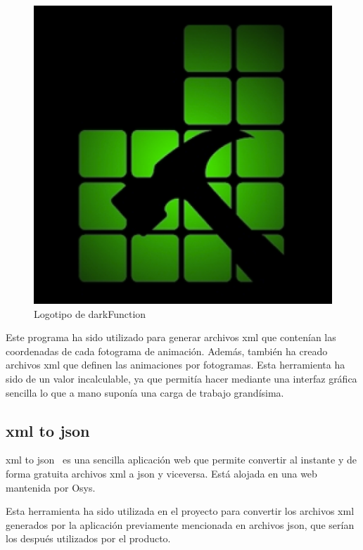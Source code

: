 		\begin{figure}[!htp]
			 \centering
			 \includegraphics[scale=.25]{fig/darkF}
			 \caption{Logotipo de darkFunction}
			 \label{fig:darkF}
		\end{figure}

		\FloatBarrier

		Este programa ha sido utilizado para generar archivos \acrshort{xml} que contenían las coordenadas de cada fotograma de animación. Además, también ha creado archivos \acrshort{xml} que definen las animaciones por fotogramas. Esta herramienta ha sido de un valor incalculable, ya que permitía hacer mediante una interfaz gráfica sencilla lo que a mano suponía una carga de trabajo grandísima.

	\subsection{\acrshort{xml} to \acrshort{json}}

		\acrshort{xml} to \acrshort{json}~\cite{xmljson} es una sencilla aplicación web que permite convertir al instante y de forma gratuita archivos \acrshort{xml} a \acrshort{json} y viceversa. Está alojada en una web mantenida por Osys.

		Esta herramienta ha sido utilizada en el proyecto para convertir los archivos \acrshort{xml} generados por la aplicación previamente mencionada en archivos \acrshort{json}, que serían los después utilizados por el producto.

